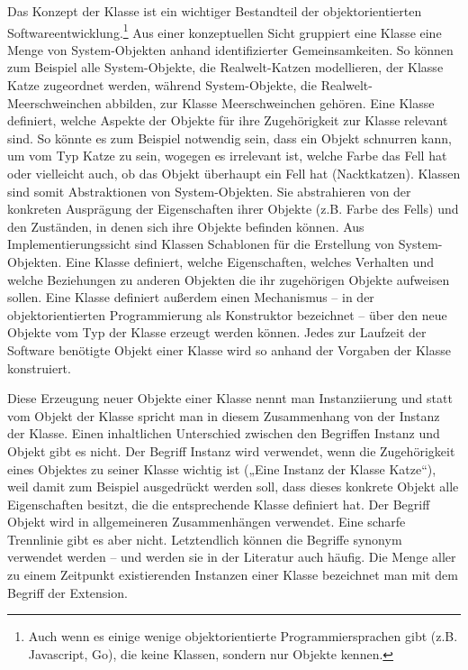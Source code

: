 Das Konzept der Klasse ist ein wichtiger Bestandteil der objektorientierten Softwareentwicklung.\footnote{Auch wenn es einige wenige objektorientierte Programmiersprachen gibt (z.B. Javascript, Go), die keine Klassen, sondern nur Objekte kennen.} Aus einer konzeptuellen Sicht gruppiert eine Klasse eine Menge von System-Objekten anhand identifizierter Gemeinsamkeiten. So können zum Beispiel alle System-Objekte, die Realwelt-Katzen modellieren, der Klasse Katze zugeordnet werden, während System-Objekte, die Realwelt-Meerschweinchen abbilden, zur Klasse Meerschweinchen gehören. Eine Klasse definiert, welche Aspekte der Objekte für ihre Zugehörigkeit zur Klasse relevant sind. So könnte es zum Beispiel notwendig sein, dass ein Objekt schnurren kann, um vom Typ Katze zu sein, wogegen es irrelevant ist, welche Farbe das Fell hat oder vielleicht auch, ob das Objekt überhaupt ein Fell hat (Nacktkatzen). Klassen sind somit Abstraktionen von System-Objekten. Sie abstrahieren von der konkreten Ausprägung der Eigenschaften ihrer Objekte (z.B. Farbe des Fells) und den Zuständen, in denen sich ihre Objekte befinden können. Aus Implementierungssicht sind Klassen Schablonen für die Erstellung von System-Objekten. Eine Klasse definiert, welche Eigenschaften, welches Verhalten und welche Beziehungen zu anderen Objekten die ihr zugehörigen Objekte aufweisen sollen. Eine Klasse definiert außerdem einen Mechanismus – in der objektorientierten Programmierung als Konstruktor bezeichnet – über den neue Objekte vom Typ der Klasse erzeugt werden können. Jedes zur Laufzeit der Software benötigte Objekt einer Klasse wird so anhand der Vorgaben der Klasse konstruiert.

Diese Erzeugung neuer Objekte einer Klasse nennt man Instanziierung und statt vom Objekt der Klasse spricht man in diesem Zusammenhang von der Instanz der Klasse. Einen inhaltlichen Unterschied zwischen den Begriffen Instanz und Objekt gibt es nicht. Der Begriff Instanz wird verwendet, wenn die Zugehörigkeit eines Objektes zu seiner Klasse wichtig ist („Eine Instanz der Klasse Katze“), weil damit zum Beispiel ausgedrückt werden soll, dass dieses konkrete Objekt alle Eigenschaften besitzt, die die entsprechende Klasse definiert hat. Der Begriff Objekt wird in allgemeineren Zusammenhängen verwendet. Eine scharfe Trennlinie gibt es aber nicht. Letztendlich können die Begriffe synonym verwendet werden – und werden sie in der Literatur auch häufig. Die Menge aller zu einem Zeitpunkt existierenden Instanzen einer Klasse bezeichnet man mit dem Begriff der Extension. 


